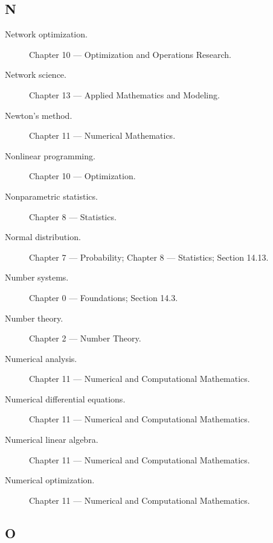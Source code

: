 \subsection*{N}

\begin{description}

\item[Network optimization.]
Chapter 10 --- Optimization and Operations Research.

\item[Network science.]
Chapter 13 --- Applied Mathematics and Modeling.

\item[Newton's method.]
Chapter 11 --- Numerical Mathematics.

\item[Nonlinear programming.]
Chapter 10 --- Optimization.

\item[Nonparametric statistics.]
Chapter 8 --- Statistics.

\item[Normal distribution.]
Chapter 7 --- Probability;
Chapter 8 --- Statistics;
Section 14.13.

\item[Number systems.]
Chapter 0 --- Foundations;
Section 14.3.

\item[Number theory.]
Chapter 2 --- Number Theory.

\item[Numerical analysis.]
Chapter 11 --- Numerical and Computational Mathematics.

\item[Numerical differential equations.]
Chapter 11 --- Numerical and Computational Mathematics.

\item[Numerical linear algebra.]
Chapter 11 --- Numerical and Computational Mathematics.

\item[Numerical optimization.]
Chapter 11 --- Numerical and Computational Mathematics.

\end{description}

\subsection*{O}


